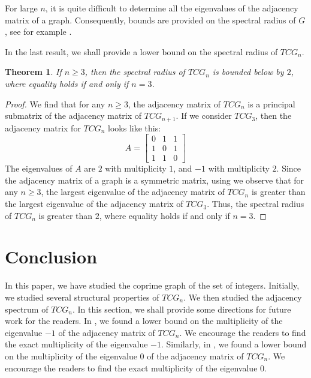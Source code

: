 \documentclass[12pt]{article}
\newtheorem{theorem}{Theorem}[section]
\begin{document}
	
	For large $n$, it is quite difficult to determine all the eigenvalues of the adjacency matrix of a graph. Consequently,  bounds are provided on the spectral radius of $G$, see for example \cite{hong2001sharp, das2004some}.
	
	In the last result, we shall provide a lower bound on the spectral radius of $TCG_n$.
	\begin{theorem}
		If $n\ge 3$, then the spectral radius of $TCG_n$ is bounded below by $2$, where equality holds if and only if $n=3$.
	\end{theorem}
	
	\begin{proof}
		We find that for any $n\ge 3$, the adjacency matrix of $TCG_n$ is a principal submatrix of the adjacency matrix of $TCG_{n+1}$.
		If we  consider $TCG_3$, then the adjacency matrix for $TCG_n$ looks like this:
		\[
		A=
		\left[
		\begin{array}{cccccc}
			0      & 1 & 1  \\
			1     & 0 & 1\\
			1 & 1 & 0
		\end{array}
		\right]
		\]
		The eigenvalues of $A$ are $2$ with multiplicity $1$, and $-1$ with multiplicity $2$. 
		Since the adjacency matrix of a graph is a symmetric matrix, 
		using  we observe that for any $n\ge 3$, the largest eigenvalue of the adjacency matrix of $TCG_n$ is greater than the largest eigenvalue of the adjacency matrix of $TCG_3$.
		Thus, the spectral radius of $TCG_n$ is greater than $2$, where equality holds if and only if $n=3$.
	\end{proof}
	
	\section{Conclusion}
	
	In this paper, we have studied the coprime graph of the set of integers.
	Initially, we studied several structural properties of $TCG_n$.
	We then studied the adjacency spectrum of $TCG_n$.
	In this section, we shall provide some directions for future work for the readers. In , we found a lower bound on the multiplicity of the eigenvalue $-1$ of the adjacency matrix of $TCG_n$. We encourage the readers to find the exact multiplicity of the eigenvalue $-1$.
	Similarly, in , we found a lower bound on the multiplicity of the eigenvalue $0$ of the adjacency matrix of $TCG_n$. We encourage the readers to find the exact multiplicity of the eigenvalue $0$.
	
\end{document}
